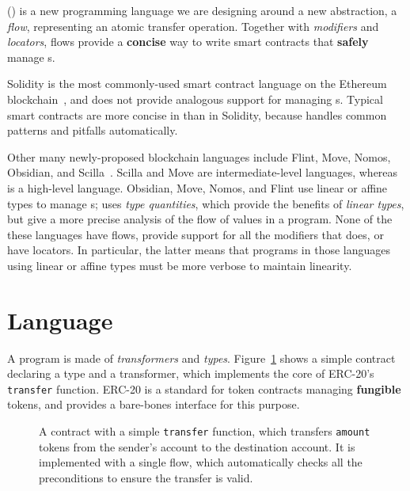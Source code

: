 \documentclass[nonacm, dvipsnames, sigconf]{acmart}
\begin{document}
\langName (\langNamePronounce) is a new programming language we are designing around a new abstraction, a \emph{flow}, representing an atomic transfer operation.
Together with \emph{modifiers} and \emph{locators}, flows provide a \textbf{concise} way to write smart contracts that \textbf{safely} manage \assetTxt{}s.

Solidity is the most commonly-used smart contract language on the Ethereum blockchain~\cite{EthereumForDevs}, and does not provide analogous support for managing \assetTxt{}s.
Typical smart contracts are more concise in \langName than in Solidity, because \langName handles common patterns and pitfalls automatically.

Other many newly-proposed blockchain languages include Flint, Move, Nomos, Obsidian, and Scilla~\cite{schrans2018flint, blackshear2019move, das2019nomos, coblenz2019obsidian, sergey2019scilla}.
Scilla and Move are intermediate-level languages, whereas \langName is a high-level language.
Obsidian, Move, Nomos, and Flint use linear or affine types to manage \assetTxt{}s; \langName uses \emph{type quantities}, which provide the benefits of \emph{linear types}, but give a more precise analysis of the flow of values in a program.
None of the these languages have flows, provide support for all the modifiers that \langName does, or have locators.
In particular, the latter means that programs in those languages using linear or affine types must be more verbose to maintain linearity.

\section{Language}\label{sec:lang}
A \langName program is made of \emph{transformers} and \emph{types}.
Figure~\ref{fig:erc20-transfer-flow} shows a simple contract declaring a type and a transformer, which implements the core of ERC-20's \lstinline{transfer} function.
ERC-20 is a standard for token contracts managing \textbf{fungible} tokens, and provides a bare-bones interface for this purpose.
\begin{figure}
    \centering
    
    \vspace{-1em}
    \caption{A \langName contract with a simple \lstinline{transfer} function, which transfers \lstinline{amount} tokens from the sender's account to the destination account.
It is implemented with a single flow, which automatically checks all the preconditions to ensure the transfer is valid.}
    \label{fig:erc20-transfer-flow}
\end{figure}
\end{document}

